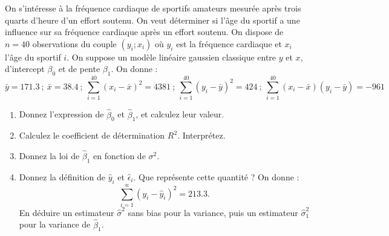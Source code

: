 \documentclass{../headers/td_upc}
\providecommand{\1}{\mathds{1}}
\begin{document}
	\cor{\newpage}
	
	On s'intéresse à la fréquence cardiaque de sportifs amateurs mesurée après
	trois quarts d'heure d'un effort soutenu.
	On veut déterminer si l'âge du sportif a une influence sur sa fréquence cardiaque
	après un effort soutenu. On dispose de $n = 40$ observations du couple 
	$(y_i;x_i)$ où $y_i$ est la fréquence cardiaque et $x_i$ l'âge du
	sportif $i$.
	On suppose un modèle linéaire gaussien classique entre $y$ et $x$,
	d'intercept $\beta_0$ et de pente $\beta_1$.
	On donne :
	\[
	\bar y = 171.3
	~ ; ~
	\bar x = 38.4
	~ ; ~
	\sum_{i=1}^{40} (x_i - \bar x)^2 = 4381
	~ ; ~
	\sum_{i=1}^{40} (y_i - \bar y)^2 = 424
	~ ; ~
	\sum_{i=1}^{40} (x_i - \bar x)(y_i - \bar y) = -961
	\]
	\begin{enumerate}
	\item Donnez l'expression de $\hat \beta_0$ et $\hat \beta_1$, et calculez leur valeur.
	\cor{
	\[
	\hat \beta_1 
	= \frac{s^2_{x,y}}{s^2_x} 
	= \frac{\sum_{i=1}^{40} (x_i - \bar x)(y_i - \bar y)}{\sum_{i=1}^{40} (x_i - \bar x)^2}
	= \frac{-961}{4381}
	= -0.2193563
	\]
	\[
	\hat\beta_0 
	= \bar y - \hat \beta_1 \bar x
	= 171.3 - (-0.2193563) \times 38.4
	= 179.7233
	\]
	}
	\item Calculez le coefficient de détermination $R^2$. Interprétez.
	\item Donnez la loi de $\hat \beta_1$ en fonction de $\sigma^2$.
	\cor{
	\[
	\hat \beta_1 \sim \mathcal{N}\left(\beta_1, \frac{\sigma^2}{\sum_{i=1}^n (x_i - \bar x)^2}\right)
	\]
	}
	\item Donnez la définition de $\hat y_i$ et $\hat \epsilon_i$.
	Que représente cette quantité ? On donne :
	\[
	\sum_{i=1}^n (y_i - \hat y_i)^2 = 213.3.
	\]
	En déduire un estimateur $\hat\sigma^2$ sans bias pour la variance, 
	puis un estimateur $\hat\sigma^2_1$ pour la variance de $\hat\beta_1$.
\end{enumerate}
\end{document}

